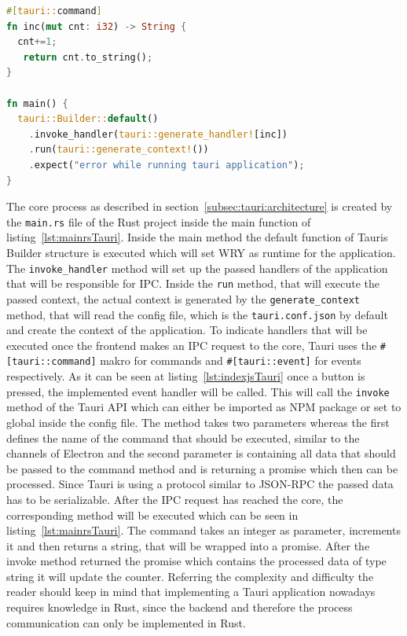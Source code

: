 \begin{lstlisting}[language=Rust,label={lst:mainrsTauri}, caption={Excerpt of main.rs}]
#[tauri::command]
fn inc(mut cnt: i32) -> String {
  cnt+=1;
   return cnt.to_string();
}

fn main() {
  tauri::Builder::default()
    .invoke_handler(tauri::generate_handler![inc])
    .run(tauri::generate_context!())
    .expect("error while running tauri application");
}
\end{lstlisting}
The core process as described in section~\ref{subsec:tauri:architecture} is created by the \texttt{main.rs} file of the Rust project inside the main function of listing~\ref{lst:mainrsTauri}.
Inside the main method the default function of Tauris Builder structure is executed which will set WRY as runtime for the application.
The \texttt{invoke\_handler} method will set up the passed handlers of the application that will be responsible for \ac{IPC}.
Inside the \texttt{run} method, that will execute the passed context, the actual context is generated by the \texttt{generate\_context} method, that will read the config file, which is the \texttt{tauri.conf.json} by default and create the context of the application.
To indicate handlers that will be executed once the frontend makes an \ac{IPC} request to the core, Tauri uses the \texttt{\#[tauri::command]} makro for commands and \texttt{\#[tauri::event]} for events respectively.
As it can be seen at listing~\ref{lst:indexjsTauri} once a button is pressed, the implemented event handler will be called. 
This will call the \texttt{invoke} method of the Tauri \ac{API} which can either be imported as \ac{NPM} package or set to global inside the config file.
The method takes two parameters whereas the first defines the name of the command that should be executed, similar to the channels of Electron and the second parameter is containing all data that should
be passed to the command method and is returning a promise which then can be processed.
Since Tauri is using a protocol similar to \ac{JSON-RPC} the passed data has to be serializable.
After the \ac{IPC} request has reached the core, the corresponding method will be executed which can be seen in listing~\ref{lst:mainrsTauri}.
The command takes an integer as parameter, increments it and then returns a string, that will be wrapped into a promise.
After the invoke method returned the promise which contains the processed data of type string it will update the counter.
Referring the complexity and difficulty the reader should keep in mind that implementing a Tauri application nowadays requires knowledge in Rust, since the backend and therefore the process communication can only be implemented in Rust.
